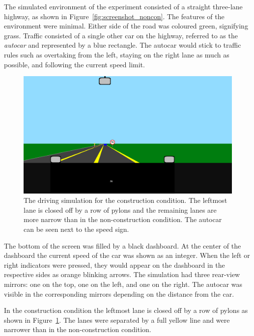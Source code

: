 The simulated environment of the experiment consisted of a straight three-lane highway, as shown in Figure~\ref{fig:screenshot_noncon}.
The features of the environment were minimal. 
Either side of the road was coloured green, signifying grass. 
Traffic consisted of a single other car on the highway, referred to as the \textit{autocar} and represented by a blue rectangle.
The autocar would stick to traffic rules such as overtaking from the left, staying on the right lane as much as possible, and following the current speed limit. 

\begin{figure}
  \centering
  \includegraphics[width=\textwidth]{images/screenshot_con.pdf}
  \caption{The driving simulation for the construction condition. 
  The leftmost lane is closed off by a row of pylons and the remaining lanes are more narrow than in the non-construction condition. 
  The autocar can be seen next to the speed sign.}
  \label{fig:screenshot_con}
\end{figure}

The bottom of the screen was filled by a black dashboard. 
At the center of the dashboard the current speed of the car was shown as an integer.
When the left or right indicators were pressed, they would appear on the dashboard in the respective sides as orange blinking arrows. 
The simulation had three rear-view mirrors: one on the top, one on the left, and one on the right. 
The autocar was visible in the corresponding mirrors depending on the distance from the car. 

In the construction condition the leftmost lane is closed off by a row of pylons as shown in Figure~\ref{fig:screenshot_con}. 
The lanes were separated by a full yellow line and were narrower than in the non-construction condition. 

